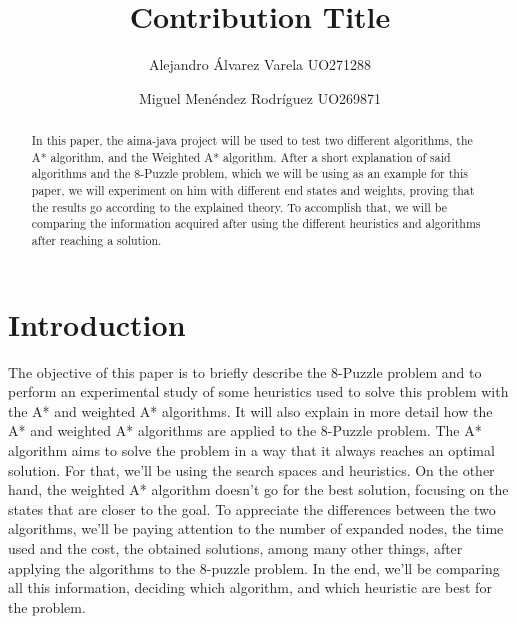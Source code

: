\documentclass[runningheads]{llncs}
\begin{document}
%
\title{Contribution Title}
%
%
\author{Alejandro Álvarez Varela UO271288\and
Miguel Menéndez Rodríguez UO269871}


\maketitle   
\begin{abstract}
In this paper, the aima-java project will be used to test two different algorithms, the A* algorithm, and the Weighted A* algorithm. After a short explanation of said algorithms and the 8-Puzzle problem, which we will be using as an example for this paper, we will experiment on him with different end states and weights, proving that the results go according to the explained theory. To accomplish that, we will be comparing the information acquired after using the different heuristics and algorithms after reaching a solution.

\end{abstract}

\section{Introduction}
The objective of this paper is to briefly describe the 8-Puzzle problem and to perform an experimental study of some heuristics used to solve this problem with the A* and weighted A* algorithms. It will also explain in more detail how the A* and weighted A* algorithms are applied to the 8-Puzzle problem.
The A* algorithm aims to solve the problem in a way that it always reaches an optimal solution. For that, we'll be using the search spaces and heuristics.
On the other hand, the weighted A* algorithm doesn't go for the best solution, focusing on the states that are closer to the goal.
To appreciate the differences between the two algorithms, we'll be paying attention to the number of expanded nodes, the time used and the cost, the obtained solutions, among many other things, after applying the algorithms to the 8-puzzle problem.
In the end, we'll be comparing all this information, deciding which algorithm, and which heuristic are best for the problem.
\end{document}
